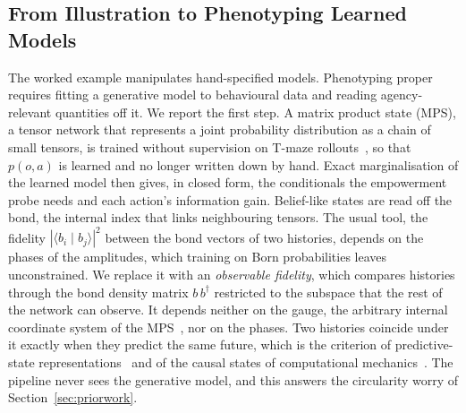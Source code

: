 \documentclass[pdflatex,sn-apa]{sn-jnl}%
\theoremstyle{definition}
\begin{document}
\subsection{From Illustration to Phenotyping Learned Models}\label{sec:learned}
The worked example manipulates hand-specified models. Phenotyping proper requires fitting a generative model to behavioural data and reading agency-relevant quantities off it. We report the first step. A matrix product state (MPS), a tensor network that represents a joint probability distribution as a chain of small tensors, is trained without supervision on T-maze rollouts~\citep{wauthierLearningGenerative2022}, so that $p(o,a)$ is learned and no longer written down by hand. Exact marginalisation of the learned model then gives, in closed form, the conditionals the empowerment probe needs and each action's information gain. Belief-like states are read off the bond, the internal index that links neighbouring tensors. The usual tool, the fidelity $|\langle b_i \mid b_j \rangle|^2$ between the bond vectors of two histories, depends on the phases of the amplitudes, which training on Born probabilities leaves unconstrained. We replace it with an \emph{observable fidelity}, which compares histories through the bond density matrix $b\,b^\dagger$ restricted to the subspace that the rest of the network can observe. It depends neither on the gauge, the arbitrary internal coordinate system of the MPS~\citep{aizpuruaTensorExplainable2024,ranTensorNetworkInterpretable2023}, nor on the phases. Two histories coincide under it exactly when they predict the same future, which is the criterion of predictive-state representations~\citep{littmanPredictiveRepresentationsState2002} and of the causal states of computational mechanics~\citep{shaliziComputationalMechanicsPattern2001}. The pipeline never sees the generative model, and this answers the circularity worry of Section~\ref{sec:priorwork}.
\end{document}
